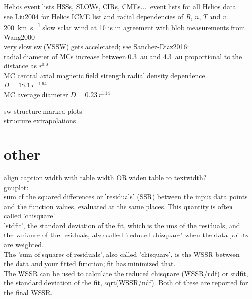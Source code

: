 Helios event lists HSSs, SLOWs, CIRs, CMEs...; event lists for all Helios data\\
see Liu2004 for Helios ICME list and radial dependencies of $B$, $n$, $T$ and $v$...\\

\SI{200}{\km\per\s} slow solar wind at \SI{10}{\Rs} is in agreement with blob measurements from Wang2000\\

very slow sw (VSSW) gets accelerated; see Sanchez-Diaz2016:\\


radial diameter of MCs increase between 0.3~au and 4.3~au proportional to the distance as $r^{0.8}$ \citep{Bothmer1998}\\
MC central axial magnetic field strength radial density dependence $B = 18.1\,r^{-1.64}$ \citet{Leitner2007}\\
MC average diameter $D = 0.23\,r^{1.14}$ \citet{Leitner2007}

sw structure marked plots\\

structure extrapolations\\


\section{other}

align caption width with table width  OR  widen table to textwidth?\\

gnuplot:\\
sum of the squared differences or 'residuals' (SSR) between the input data points and the function values, evaluated at the same places. This quantity is often called 'chisquare'\\
'stdfit', the standard deviation of the fit, which is the rms of the residuals, and the variance of the residuals, also called 'reduced chisquare' when the data points are weighted.\\
The 'sum of squares of residuals', also called 'chisquare', is the WSSR between the data and your fitted function; fit has minimized that.\\
The WSSR can be used to calculate the reduced chisquare (WSSR/ndf) or stdfit, the standard deviation of the fit, sqrt(WSSR/ndf). Both of these are reported for the final WSSR.\\

